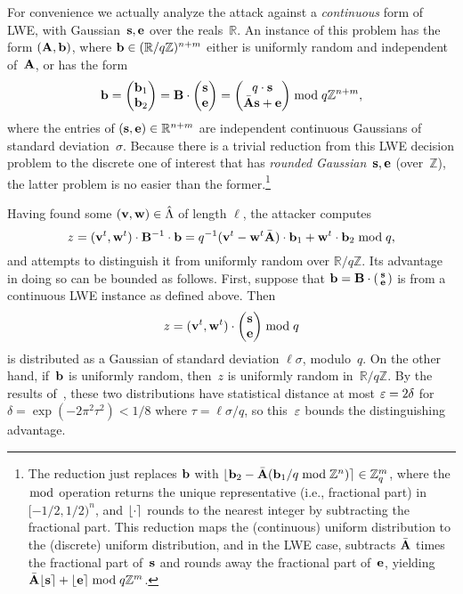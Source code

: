 For convenience we actually analyze the attack against a
\emph{continuous} form of LWE, with Gaussian~$\mathbf{s}, \mathbf{e}$ over the
reals~$\mathbb{R}$. An instance of this problem has the form
$(\mathbf{A}, \mathbf{b})$, where $\mathbf{b} \in (\mathbb{R}/q\mathbb{Z})^{n + m}$
either is uniformly random and independent of~$\mathbf{A}$, or has the form
\[
  \mathbf{b} =
  \begin{pmatrix}
    \mathbf{b}_{1} \\ \mathbf{b}_{2}
  \end{pmatrix}
  = \mathbf{B} \cdot
  \begin{pmatrix}
    \mathbf{s} \\ \mathbf{e}
  \end{pmatrix} =
  \begin{pmatrix}
    q \cdot \mathbf{s} \\ \bar {\mathbf{A}} \mathbf{s} + \mathbf{e}
  \end{pmatrix}
  \bmod q \mathbb{Z}^{n + m} , \] where the entries of
$(\mathbf{s}, \mathbf{e}) \in \mathbb{R}^{n + m}$ are independent continuous
Gaussians of standard deviation~$\sigma$. Because there is a trivial
reduction from this LWE decision problem to the discrete one of
interest that has \emph{rounded Gaussian}~$\mathbf{s}, \mathbf{e}$
(over~$\mathbb{Z}$), the latter problem is no easier than the
former.\footnote{The reduction just replaces $\mathbf{b}$ with
  $\lfloor\mathbf{b}_{2} - \bar {\mathbf{A}} (\mathbf{b}_{1}/q \bmod \mathbb{Z}^{n})\rceil \in
  \mathbb{Z}_{q}^{m}$, where the $\bmod$ operation returns the unique
  representative (i.e., fractional part) in $[-1/2, 1/2)^{n}$, and
  $\lfloor\cdot\rceil$ rounds to the nearest integer by subtracting the
  fractional part. This reduction maps the (continuous) uniform
  distribution to the (discrete) uniform distribution, and in the LWE
  case, subtracts $\bar {\mathbf{A}}$ times the fractional part of~$\mathbf{s}$ and
  rounds away the fractional part of~$\mathbf{e}$, yielding
  $\bar {\mathbf{A}} \lfloor\mathbf{s}\rceil + \lfloor\mathbf{e}\rceil \bmod q\mathbb{Z}^{m}$.}

Having found some $(\mathbf{v},\mathbf{w}) \in \hat\Lambda$ of length $\ell$, the
attacker computes
\[ z = (\mathbf{v}^{t}, \mathbf{w}^{t}) \cdot \mathbf{B}^{-1} \cdot \mathbf{b} = q^{-1}
  (\mathbf{v}^{t} - \mathbf{w}^{t} \bar {\mathbf{A}}) \cdot \mathbf{b}_{1} + \mathbf{w}^{t} \cdot
  \mathbf{b}_{2} \bmod q , \] and attempts to distinguish it from uniformly
random over $\mathbb{R}/q\mathbb{Z}$. Its advantage in doing so can be
bounded as follows. First, suppose that $\mathbf{b} = \mathbf{B} \cdot \left(
  \begin{smallmatrix}
    \mathbf{s} \\ \mathbf{e}
  \end{smallmatrix}
\right)$ is from a continuous LWE instance as defined above. Then
\[ z = (\mathbf{v}^{t}, \mathbf{w}^{t}) \cdot
  \begin{pmatrix}
    \mathbf{s} \\ \mathbf{e}
  \end{pmatrix} \bmod q \] is distributed as a Gaussian of standard
deviation $\ell \sigma$, modulo~$q$. On the other hand, if~$\mathbf{b}$ is
uniformly random, then~$z$ is uniformly random
in~$\mathbb{R}/q\mathbb{Z}$. By the results
of~\cite{DBLP:journals/siamcomp/MicciancioR07}, these two
distributions have statistical distance at most $\varepsilon = 2\delta$ for
$\delta = \exp(-2\pi^2 \tau^2) < 1/8$ where $\tau = \ell \sigma / q$,
so this~$\varepsilon$ bounds the distinguishing advantage.

